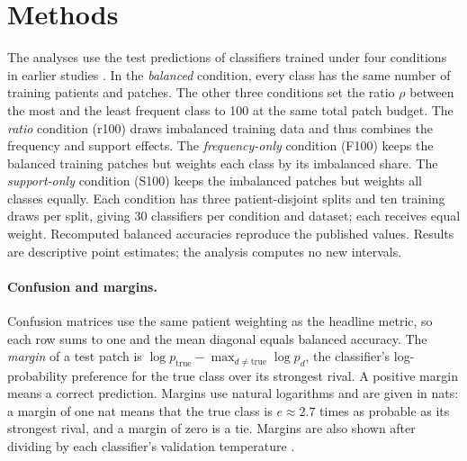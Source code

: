 \documentclass[11pt]{article}
\begin{document}
\section{Methods}
\label{sec:methods}
The analyses use the test predictions of classifiers trained under four conditions in earlier studies \citep{queisler2026prevalenceTcga, queisler2026prevalenceBracs, queisler2026causeTcga, queisler2026causeBracs}. In the \emph{balanced} condition, every class has the same number of training patients and patches. The other three conditions set the ratio $\rho$ between the most and the least frequent class to 100 at the same total patch budget. The \emph{ratio} condition (r100) draws imbalanced training data and thus combines the frequency and support effects. The \emph{frequency-only} condition (F100) keeps the balanced training patches but weights each class by its imbalanced share. The \emph{support-only} condition (S100) keeps the imbalanced patches but weights all classes equally. Each condition has three patient-disjoint splits and ten training draws per split, giving 30 classifiers per condition and dataset; each receives equal weight. Recomputed balanced accuracies reproduce the published values. Results are descriptive point estimates; the analysis computes no new intervals.

\paragraph{Confusion and margins.} Confusion matrices use the same patient weighting as the headline metric, so each row sums to one and the mean diagonal equals balanced accuracy. The \emph{margin} of a test patch is $\log p_{\text{true}} - \max_{d\neq\text{true}} \log p_d$, the classifier's log-probability preference for the true class over its strongest rival. A positive margin means a correct prediction. Margins use natural logarithms and are given in nats: a margin of one nat means that the true class is $e\approx2.7$ times as probable as its strongest rival, and a margin of zero is a tie. Margins are also shown after dividing by each classifier's validation temperature \citep{guo2017calibration}.
\end{document}
